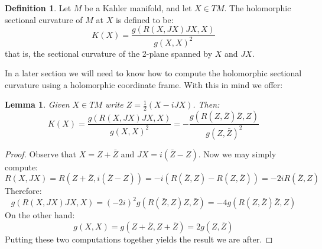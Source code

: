 \documentclass[11pt]{amsart}
\newtheorem{lem}[subsection]{Lemma}
\theoremstyle{definition}
\newtheorem{definition}[subsection]{Definition}
\begin{document}
\begin{definition} Let $M$ be a Kahler manifold, and let $X \in TM$. The holomorphic sectional curvature of $M$ at $X$ is defined to be:
$$ K(X) = \frac{ g( R(X, JX) JX, X) }{ g( X, X )^2 } $$
that is, the sectional curvature of the 2-plane spanned by $X$ and $JX$.
\end{definition}
%
In a later section we will need to know how to compute the holomorphic sectional curvature using a holomorphic coordinate frame.  With this in mind we offer:
%
\begin{lem} Given $X \in TM$ write $Z = \frac{1}{2}( X - i JX )$.  Then:
$$ K(X) = \frac{ g( R(X, JX) JX, X) }{ g( X, X )^2 } = - \frac{ g( R(Z, \bar{Z}) \bar{Z}, Z) }{g( Z, \bar{Z} )^2 } $$
\end{lem}
%
\begin{proof} Observe that $X = Z + \bar{Z}$ and $JX = i( \bar{Z} - Z )$.  Now we may simply compute:
%
$$ R(X, JX) = R( Z + \bar{Z}, i( \bar{Z} - Z ) ) = - i( R( \bar{Z}, Z ) - R( Z, \bar{Z} ) ) = - 2i R( \bar{Z}, Z )$$
%
Therefore:
%
$$ g( R(X, JX) JX, X ) = (-2i)^2 g( R(\bar{Z}, Z) Z, \bar{Z} ) = -4 g( R(Z, \bar{Z}) \bar{Z}, Z ) $$
%
On the other hand:
%
$$ g(X, X) = g(Z + \bar{Z}, Z + \bar{Z}) = 2 g(Z, \bar{Z}) $$
%
Putting these two computations together yields the result we are after.
%
\end{proof}
%
\end{document}
